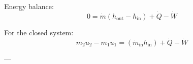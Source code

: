 Energy balance:  
\[
0 = \dot{m} \left( h_{\text{out}} - h_{\text{in}} \right) + \dot{Q} - \dot{W}
\]  

For the closed system:  
\[
m_2 u_2 - m_1 u_1 = \left( \dot{m}_{\text{in}} h_{\text{in}} \right) + \dot{Q} - \dot{W}
\]  

---